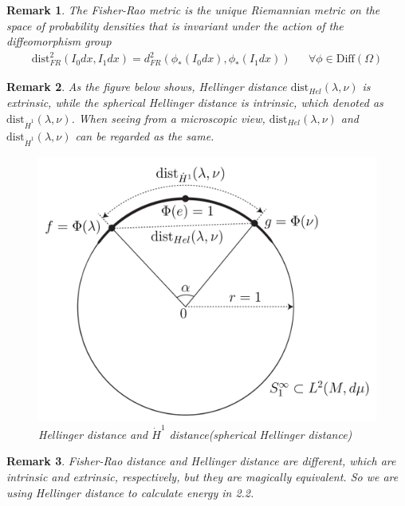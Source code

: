 \documentclass{article}
\theoremstyle{definition}
\theoremstyle{plain}
\newtheorem{remark}{Remark}
\begin{document}
\begin{remark}
The Fisher-Rao metric is the unique Riemannian metric on the space of probability densities that is invariant under the action of the diffeomorphism group
\begin{align*}
    \mathrm{dist}^2_{FR}(I_0dx,I_1dx)=d^2_{FR}(\phi_*(I_0dx),\phi_*(I_1dx)) &&\forall \phi\in \mathrm{Diff}(\Omega)
\end{align*}
\end{remark}

\begin{remark}
As the figure below shows, Hellinger distance $\mathrm{dist}_{Hel}(\lambda, \nu)$ is extrinsic, while the spherical Hellinger distance is intrinsic, which denoted as $\mathrm{dist}_{\Dot{H}^1}(\lambda, \nu)$. When seeing from a microscopic view, $\mathrm{dist}_{Hel}(\lambda, \nu)$ and $\mathrm{dist}_{\Dot{H}^1}(\lambda, \nu)$ can be regarded as the same.
\begin{figure}[H]
\centering
\includegraphics[scale=0.3]{hellinger.png}
\caption{Hellinger distance and $\Dot H^1$ distance(spherical Hellinger distance)}
\end{figure}
\end{remark}

\begin{remark}\label{remark:fr}
Fisher-Rao distance and Hellinger distance are different, which are intrinsic and extrinsic, respectively, but they are magically equivalent. So we are using Hellinger distance to calculate energy in 2.2.
\end{remark}
\end{document}
